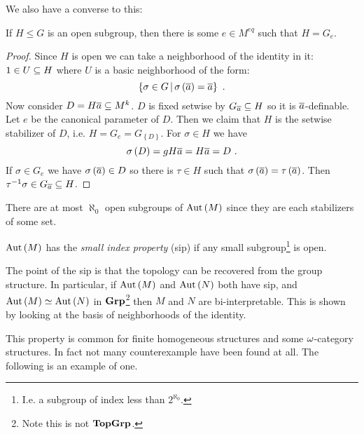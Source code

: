 \documentclass{amsart}
\begin{document}
We also have a converse to this:

\begin{prop}
If $H\leq G$ is an open subgroup, then there is some $e\in M^{eq}$ such that
$H = G_e$.
\end{prop}

\begin{proof}
Since $H$ is open we can take a neighborhood of the identity in it:
$1\in U\subseteq H$ where $U$ is a basic neighborhood of the form:
\begin{equation}
\left\{ \sigma \in G \, \middle\vert \, \sigma\left( \overline{a} \right) = \overline{a} \right\} \ .
\end{equation}
Now consider $D = H\overline{a}\subseteq M^k$. $D$ is fixed setwise by $G_{\overline{a}}\subseteq H$
so it is $\overline{a}$-definable. 
Let $e$ be the canonical parameter of $D$. Then we claim that $H$ is the setwise
stabilizer of $D$, i.e. $H = G_e = G_{ \left\{ D \right\}}$. 
For $\sigma \in H$ we have 
\begin{equation}
\sigma\left( D \right) = gH\overline{a} = H\overline{a} = D \ .
\end{equation}
If $\sigma\in G_e$ we have
$\sigma\left( \overline{a} \right)\in D$
so there is $\tau\in H$ such that 
$\sigma\left( \overline{a} \right) = \tau \left( \overline{a} \right)$.
Then $\tau^{-1} \sigma \in G_{\overline{a}} \subseteq H$.
\end{proof}

\begin{rmk}
There are at most $\aleph_0$ open subgroups of $\operatorname{Aut}\left( M \right)$ since they are each
stabilizers of some set.
\end{rmk}

\begin{defn}
$\operatorname{Aut}\left( M \right)$ has the \emph{small index property} (sip) if any small
subgroup\footnote{I.e.  a subgroup of index less than $2^{\aleph_0}$.} is open.
\end{defn}

\begin{rmk}
The point of the sip is that the topology can be recovered from the group structure.
In particular, if $\operatorname{Aut}\left( M \right)$ and $\operatorname{Aut}\left( N \right)$ both have sip, and 
$\operatorname{Aut}\left( M \right)\simeq \operatorname{Aut}\left( N \right)$ in $\mathbf{Grp}$\footnote{Note this is not
$\mathbf{TopGrp}$.} then $M$ and $N$ are bi-interpretable. This is shown by looking at the basis
of neighborhoods of the identity.
\end{rmk}

This property is common for finite homogeneous structures and some $\omega$-category
structures. 
In fact not many counterexample have been found at all. The following is an example of
one.
\end{document}
